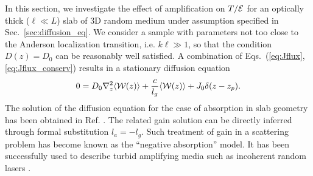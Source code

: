 In this section, we investigate the effect of amplification on $T/{\cal E}$ for an optically thick ($\ell\ll L$) slab of 3D random medium under assumption specified in Sec.~\ref{sec:diffusion_eq}. We consider a sample with parameters not too close to the Anderson localization transition\cite{1960_Ioffe_criterion}, i.e. $k\ell\gg 1$, so that the condition $D(z)=D_0$ can be reasonably well satisfied. A combination of Eqs.~(\ref{eq:Jflux},\ref{eq:Jflux_conserv}) results in a stationary diffusion equation
\begin{equation}
0=
D_0\nabla_z^2 \langle {\cal W}(z)\rangle+
\frac{c}{l_g}\langle {\cal W}(z)\rangle+J_0 \delta(z-z_p).
\label{eq:diffusion_equation}
\end{equation}
The solution of the diffusion equation for the case of absorption in slab geometry has been obtained in Ref. \cite{1993_Lisyansky_diffusint,1999_van_Rossum}. The related gain solution can be directly inferred through formal substitution $l_a=-l_g$. Such treatment of gain in a scattering problem has become known as the ``negative absorption'' model. It has been successfully used to describe turbid amplifying media such as incoherent random lasers \cite{1968_Letokhov,1994_lawandy_nature,2001_vansoest_thesis}.

